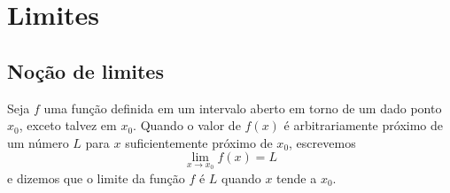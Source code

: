 
\chapter{Limites}\label{cap_lim}
\thispagestyle{fancy}

\section{Noção de limites}

Seja $f$ uma função definida em um intervalo aberto em torno de um dado ponto $x_0$, exceto talvez em $x_0$. Quando o valor de $f(x)$ é arbitrariamente próximo de um número $L$ para $x$ suficientemente próximo de $x_0$, escrevemos
\begin{equation}
  \lim_{x\to x_0} f(x) = L
\end{equation}
e dizemos que o limite da função $f$ é $L$ quando $x$ tende a $x_0$.

